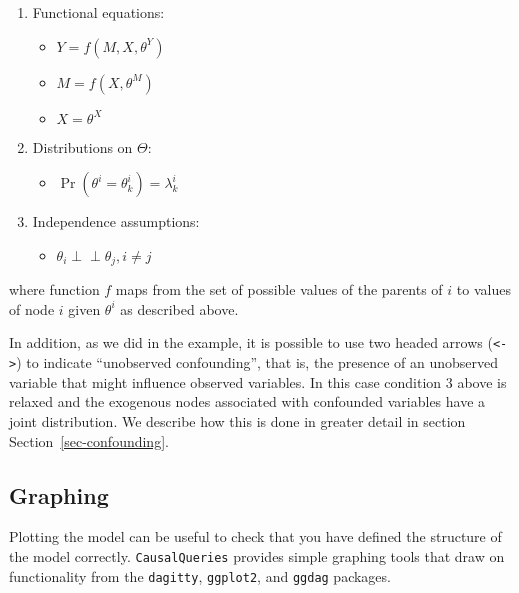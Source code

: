 \documentclass[
  11pt,
  article]{jss}
\providecommand{\tightlist}{%
  \setlength{\itemsep}{0pt}\setlength{\parskip}{0pt}}\usepackage{longtable,booktabs,array}
\begin{document}
\begin{enumerate}
\def\labelenumi{\arabic{enumi}.}
\item
  Functional equations:

  \begin{itemize}
  \tightlist
  \item
    \(Y = f(M, X, \theta^Y)\)
  \item
    \(M = f(X, \theta^M)\)
  \item
    \(X = \theta^X\)
  \end{itemize}
\item
  Distributions on \(\Theta\):

  \begin{itemize}
  \tightlist
  \item
    \(\Pr(\theta^i = \theta^i_k) = \lambda^i_k\)
  \end{itemize}
\item
  Independence assumptions:\\

  \begin{itemize}
  \tightlist
  \item
    \(\theta_i \perp\!\!\! \perp \theta_j, i\neq j\)
  \end{itemize}
\end{enumerate}

where function \(f\) maps from the set of possible values of the parents
of \(i\) to values of node \(i\) given \(\theta^i\) as described above.

In addition, as we did in the \citet{chickering1996clinician} example,
it is possible to use two headed arrows
(\texttt{\textless{}-\textgreater{}}) to indicate ``unobserved
confounding'', that is, the presence of an unobserved variable that
might influence observed variables. In this case condition 3 above is
relaxed and the exogenous nodes associated with confounded variables
have a joint distribution. We describe how this is done in greater
detail in section Section~\ref{sec-confounding}.

\hypertarget{graphing}{%
\subsection{Graphing}\label{graphing}}

Plotting the model can be useful to check that you have defined the
structure of the model correctly. \texttt{CausalQueries} provides simple
graphing tools that draw on functionality from the \texttt{dagitty},
\texttt{ggplot2}, and \texttt{ggdag} packages.
\end{document}

